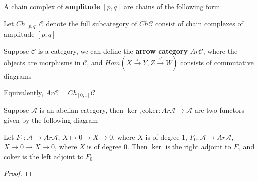 \documentclass[../main.tex]{subfiles}
\begin{document}
\begin{definition}
A chain complex of \textbf{amplitude} $[p,q]$ are chains of the following form
\begin{center}
\end{center}
Let $Ch_{[p,q]}\mathscr C$ denote the full subcategory of $Ch\mathscr C$ consist of chain complexes of amplitude $[p,q]$
\end{definition}

\begin{definition}
Suppose $\mathscr C$ is a category, we can define the \textbf{arrow category} $Ar\mathscr{C}$, where the objects are morphisms in $\mathscr C$, and $Hom(X\xrightarrow{f}Y,Z\xrightarrow{g}W)$ consists of commutative diagrams
\begin{center}
\end{center}
Equivalently, $Ar\mathscr C=Ch_{[0,1]}\mathscr C$
\end{definition}

\begin{lemma}
Suppose $\mathscr A$ is an abelian category, then $\ker,\mathrm{coker}:Ar\mathscr A\to\mathscr A$ are two functors given by the following diagram
\begin{center}
\end{center}
Let $F_1:\mathscr A\to Ar\mathscr A$, $X\mapsto 0\to X\to0$, where $X$ is of degree $1$, $F_0:\mathscr A\to Ar\mathscr A$, $X\mapsto 0\to X\to0$, where $X$ is of degree $0$. Then $\ker$ is the right adjoint to $F_1$ and $\mathrm{coker}$ is the left adjoint to $F_0$
\end{lemma}

\begin{proof}

\end{proof}
\end{document}
